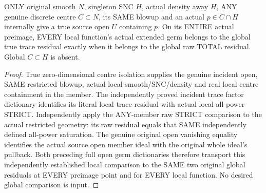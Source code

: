 \begin{lemma}
\label{hir:sharp-actual-incident-discrete-global-trace-raw-residual-germs}
\leanok
ONLY original smooth $N$, singleton SNC $H$, actual density away $H$,
ANY genuine discrete centre $C\subset N$, its SAME blowup and an actual
$p\in C\cap H$ internally give a true source open $U$ containing $p$.
On its ENTIRE actual preimage, EVERY local function's actual extended
germ belongs to the global true trace residual exactly when it belongs
to the global raw TOTAL residual. Global $C\subset H$ is absent.
\end{lemma}
\begin{proof}
True zero-dimensional centre isolation supplies the genuine incident open,
SAME restricted blowup, actual local smooth/SNC/density and real local
centre containment in the member. The independently proved incident trace
factor dictionary identifies its literal local trace residual with actual
local all-power STRICT. Independently apply the ANY-member raw STRICT
comparison to the actual restricted geometry: its raw residual equals
that SAME independently defined all-power saturation. The genuine original
open vanishing equality identifies the actual source open member ideal
with the original whole ideal's pullback. Both preceding full open germ
dictionaries therefore transport this independently established local
comparison to the SAME two original global residuals at EVERY preimage
point and for EVERY local function. No desired global comparison is input.
\end{proof}

